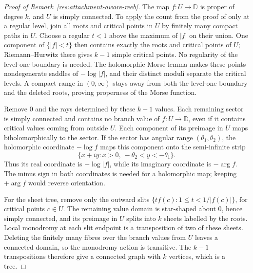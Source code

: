 \documentclass[11pt]{article}
\begin{document}
\begin{proof}[Proof of Remark~\ref{res:attachment-aware-reeb}]
The map $f:U\to\mathbb D$ is proper of degree $k$, and $U$ is simply
connected. To apply the count from the proof of
\cite[Proposition~2.1]{eks2010} only at a regular level, join all roots and
critical points in $U$ by finitely many compact paths in $U$. Choose a
regular $t<1$ above the maximum of $|f|$ on their union. One component of
$\{|f|<t\}$ then contains exactly the roots and critical points of $U$;
Riemann--Hurwitz there gives $k-1$ simple critical points. No regularity
of the level-one boundary is needed. The holomorphic Morse lemma makes
these points nondegenerate saddles of $-\log|f|$, and their distinct
moduli separate the critical levels. A compact range in $(0,\infty)$
stays away from both the level-one boundary and the deleted roots, proving
properness of the Morse function.

Remove $0$ and the rays determined by these $k-1$ values. Each remaining
sector is simply connected and contains no branch value of
$f:U\to\mathbb D$, even if it contains critical values coming from outside
$U$. Each component of its preimage in $U$ maps biholomorphically to the
sector. If the sector has angular range $(\theta_1,\theta_2)$, the
holomorphic coordinate $-\log f$ maps this component onto the
semi-infinite strip
\[
 \{x+iy:x>0,\ -\theta_2<y<-\theta_1\}.
\]
Thus its real coordinate is $-\log|f|$, while its imaginary coordinate
is $-\arg f$. The minus sign in both coordinates is needed for a
holomorphic map; keeping $+\arg f$ would reverse orientation.

For the sheet tree, remove only the outward slits
$\{tf(c):1\le t<1/|f(c)|\}$, for critical points $c\in U$.
The remaining value domain is star-shaped about $0$, hence simply
connected, and its preimage in $U$ splits into $k$ sheets labelled by the
roots. Local monodromy at each slit endpoint is a transposition of two
of these sheets. Deleting the finitely many fibres over the branch values
from $U$ leaves a connected domain, so the monodromy action is transitive.
The $k-1$ transpositions therefore give a connected graph with $k$ vertices,
which is a tree.


\end{proof}
\end{document}
